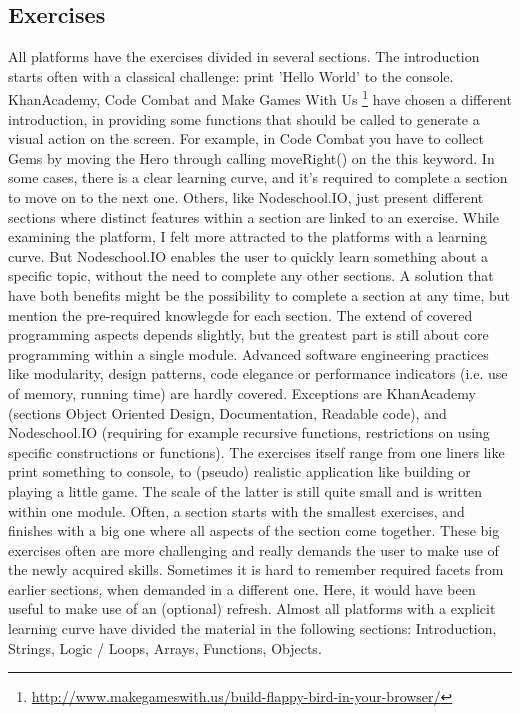 \documentclass{article}
\begin{document}
\subsection{Exercises}
All platforms have the exercises divided in several sections. The introduction
starts often with a classical challenge: print 'Hello World' to the console. 
KhanAcademy, Code Combat and Make Games With Us
\footnote{\url{http://www.makegameswith.us/build-flappy-bird-in-your-browser/}}
have chosen a different introduction, in providing some functions that should be
called to generate a visual action on the screen. For example, in Code Combat 
you have to collect Gems by moving the Hero through calling moveRight() on 
the this keyword. \newline
In some cases, there is a clear learning curve, and it's required to complete a
section to move on to the next one. Others, like Nodeschool.IO, just present 
different sections where distinct features within a section are linked to an
exercise. While examining the platform, I felt more attracted to the platforms
with a learning curve. But Nodeschool.IO enables the user to quickly learn 
something about a specific topic, without the need to complete any other
sections. A solution that have both benefits might be the possibility to 
complete a section at any time, but mention the pre-required knowlegde for each
section. \newline
The extend of covered programming aspects depends slightly, but the greatest 
part is still about core programming within a single module. Advanced software
engineering practices like modularity, design patterns, code elegance or 
performance indicators (i.e. use of memory, running time) are hardly covered. 
Exceptions are KhanAcademy (sections Object Oriented Design, Documentation, 
Readable code), and Nodeschool.IO (requiring for example recursive functions, 
restrictions on using specific constructions or functions). \newline
The exercises itself range from one liners like print something to console, to
(pseudo) realistic application like building or playing a little game. 
The scale of the latter is still quite small and is written within one module.
Often, a section starts with the smallest exercises, and finishes with a big 
one where all aspects of the section come together. These big exercises often 
are more challenging and really demands the user to make use of the newly 
acquired skills. Sometimes it is hard to remember required facets from earlier
sections, when demanded in a different one. Here, it would have been useful to 
make use of an (optional) refresh. Almost all platforms with a explicit
learning curve have divided the 
material in the following sections: Introduction, Strings, Logic / Loops, 
Arrays, Functions, Objects. 
\end{document}
